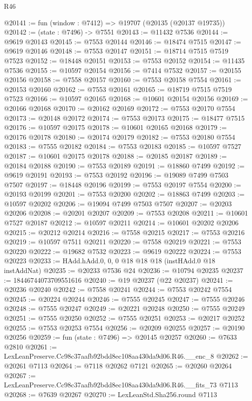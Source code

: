 \begin{lexlean}{R46}
\begin{coremodule}
@20141 := fun (window : @7412) => @19707 (@20135 (@20137 @19735))
@20142 := (state : @7496) -> @7551
@20143 := @11432 @7536
@20144 := @9619 @20143
@20145 := @7553 @20144
@20146 := @18474 @7515
@20147 := @9619 @20146
@20148 := @7553 @20147
@20151 := @18714 @7515 @7519 @7523
@20152 := @18448 @20151
@20153 := @7553 @20152
@20154 := @11435 @7536
@20155 := @10597 @20154
@20156 := @7414 @7532
@20157 := @20155 @20156
@20158 := @7558 @20157
@20160 := @7553 @20158 @7554
@20161 := @20153 @20160
@20162 := @7553 @20161
@20165 := @18719 @7515 @7519 @7523
@20166 := @10597 @20165
@20168 := @10601 @20154 @20156
@20169 := @20166 @20168
@20170 := @20162 @20169
@20172 := @7553 @20170 @7554
@20173 := @20148 @20172
@20174 := @7553 @20173
@20175 := @18477 @7515
@20176 := @10597 @20175
@20178 := @10601 @20165 @20168
@20179 := @20176 @20178
@20180 := @20174 @20179
@20182 := @7553 @20180 @7554
@20183 := @7555 @20182
@20184 := @7553 @20183
@20185 := @10597 @7527
@20187 := @10601 @20175 @20178
@20188 := @20185 @20187
@20189 := @20184 @20188
@20190 := @7553 @20189
@20191 := @18860 @7499
@20192 := @9619 @20191
@20193 := @7553 @20192
@20196 := @19089 @7499 @7503 @7507
@20197 := @18448 @20196
@20199 := @7553 @20197 @7554
@20200 := @20193 @20199
@20201 := @7553 @20200
@20202 := @18863 @7499
@20203 := @10597 @20202
@20206 := @19094 @7499 @7503 @7507
@20207 := @20203 @20206
@20208 := @20201 @20207
@20209 := @7553 @20208
@20211 := @10601 @7527 @20187
@20212 := @10597 @20211
@20214 := @10601 @20202 @20206
@20215 := @20212 @20214
@20216 := @7558 @20215
@20217 := @7553 @20216
@20219 := @10597 @7511 @20211
@20220 := @7558 @20219
@20221 := @7553 @20220
@20222 := @19682 @7532
@20223 := @9619 @20222
@20224 := @7553 @20223
@20233 := HAdd.hAdd.{0, 0, 0} @18 @18 @18 (instHAdd.{0} @18 instAddNat)
@20235 := @20233 @7536 @24
@20236 := @10794 @20235
@20237 := 18446744073709551616
@20240 := @19 @20237 (@22 @20237)
@20241 := @20236 @20240
@20242 := @7558 @20241
@20244 := @7553 @20242 @7554
@20245 := @20224 @20244
@20246 := @7555 @20245
@20247 := @7555 @20246
@20248 := @7555 @20247
@20249 := @20221 @20248
@20250 := @7555 @20249
@20251 := @7555 @20250
@20252 := @7555 @20251
@20253 := @20217 @20252
@20255 := @7553 @20253 @7554
@20256 := @20209 @20255
@20257 := @20190 @20256
@20259 := fun (state : @7496) => @20145 @20257
@20260 := @7633 @2810
@20261 := LexLeanPreserve.Cc98c37aafb92bdd8ec108aa430da9d06.R46.__enc_8
@20262 := @20261 @7113
@20264 := @7118 @20262 @7121
@20265 := @20260 @20264
@20267 := LexLeanPreserve.Cc98c37aafb92bdd8ec108aa430da9d06.R46.__fits_73 @7113
@20268 := @7639 @20267
@20270 := LexLeanStd.Sha256.round @7113

\end{coremodule}
\end{lexlean}
